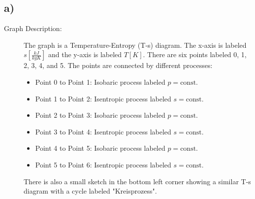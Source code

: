

\subsection*{a)}

\begin{description}
    \item[Graph Description:] The graph is a Temperature-Entropy (T-s) diagram. The x-axis is labeled $s \left[ \frac{kJ}{kgK} \right]$ and the y-axis is labeled $T \left[ K \right]$. There are six points labeled 0, 1, 2, 3, 4, and 5. The points are connected by different processes:
    \begin{itemize}
        \item Point 0 to Point 1: Isobaric process labeled $p = \text{const}$.
        \item Point 1 to Point 2: Isentropic process labeled $s = \text{const}$.
        \item Point 2 to Point 3: Isobaric process labeled $p = \text{const}$.
        \item Point 3 to Point 4: Isentropic process labeled $s = \text{const}$.
        \item Point 4 to Point 5: Isobaric process labeled $p = \text{const}$.
        \item Point 5 to Point 6: Isentropic process labeled $s = \text{const}$.
    \end{itemize}
    There is also a small sketch in the bottom left corner showing a similar T-s diagram with a cycle labeled "Kreisprozess".
\end{description}